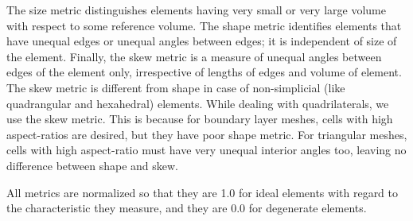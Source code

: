  The size metric distinguishes elements having very small or very large volume with respect to some reference volume. The shape metric identifies elements that have unequal edges or unequal angles between edges; it is independent of size of the element. Finally, the skew metric is a measure of unequal angles between edges of the element only, irrespective of lengths of edges and volume of element. The skew metric is different from shape in case of non-simplicial (like quadrangular and hexahedral) elements. While dealing with quadrilaterals, we use the skew metric. This is because for boundary layer meshes, cells with high aspect-ratios are desired, but they have poor shape metric. For triangular meshes, cells with high aspect-ratio must have very unequal interior angles too, leaving no difference between shape and skew.
 
 All metrics are normalized so that they are 1.0 for ideal elements with regard to the characteristic they measure, and they are 0.0 for degenerate elements. 
 
